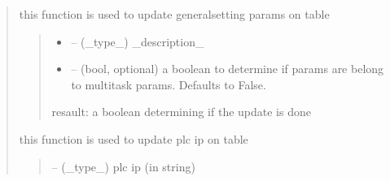 \documentclass[letterpaper,10pt,english]{sphinxmanual}
\begin{document}
\begin{quote}
\begin{savenotes}
\begin{fulllineitems}
\begin{savenotes}\begin{fulllineitems}
\label{\detokenize{setting/database_utils:oxin.database_utils.dataBaseUtils.update_general_setting_params}}
\pysigstartsignatures
{}
\pysigstopsignatures
\sphinxAtStartPar
this function is used to update general\sphinxhyphen{}setting params on table
\begin{quote}\begin{description}
\begin{itemize}
\item {} 
\sphinxAtStartPar
{} – (\_type\_) \_description\_

\item {} 
\sphinxAtStartPar
{} – (bool, optional) a boolean to determine if params are belong to multitask params. Defaults to False.

\end{itemize}

\sphinxAtStartPar
resault: a boolean determining if the update is done

\end{description}\end{quote}

\end{fulllineitems}\end{savenotes}


\begin{savenotes}\begin{fulllineitems}
\label{\detokenize{setting/database_utils:oxin.database_utils.dataBaseUtils.update_plc_ip}}
\pysigstartsignatures
{}
\pysigstopsignatures
\sphinxAtStartPar
this function is used to update plc ip on table
\begin{quote}\begin{description}
\sphinxAtStartPar
{} – (\_type\_) plc ip (in string)


\end{description}
\end{quote}
\end{fulllineitems}
\end{savenotes}
\end{fulllineitems}
\end{savenotes}
\end{quote}
\end{document}

